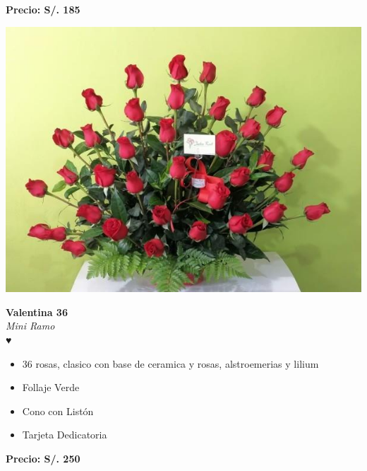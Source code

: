 \documentclass{article}
\begin{document}
\vspace{0.3cm}
\begin{center}
   \textbf{\Large Precio: \textcolor{cpred}{S/. 185 }}
\end{center}
\vspace{1cm}
\noindent
\begin{minipage}{0.35\textwidth}
    \includegraphics[width=1.0\textwidth]{imagenes_extraidas/image_11_3}
\end{minipage}
\hspace{1cm}
\begin{minipage}{0.6\textwidth}
    \textcolor{cpred}{\textbf{\huge Valentina 36 }}\\
    {\textit{Mini Ramo}} \\
    \textcolor{cpred}{\Huge ♥} \\
    \vspace{0.5cm}
    \begin{itemize}
        \item 36 rosas, clasico con base de ceramica y rosas, alstroemerias y lilium
        \item Follaje Verde
        \item Cono con Listón
        \item Tarjeta Dedicatoria
    \end{itemize}
\end{minipage}
\vspace{0.3cm}
\begin{center}
   \textbf{\Large Precio: \textcolor{cpred}{S/. 250 }}
\end{center}
\vspace{1cm}
\end{document}
